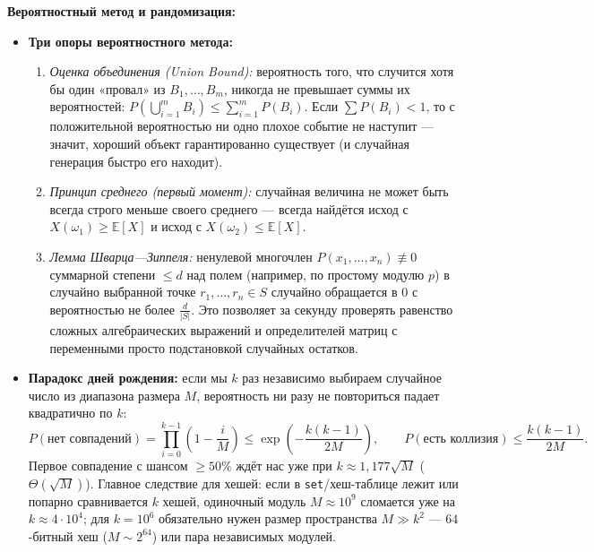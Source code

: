 \documentclass[10pt,a4paper]{article}
\renewcommand{\le}{\leqslant}
\renewcommand{\ge}{\geqslant}
\newcommand{\E}{\mathbb{E}}
\begin{document}
\textbf{Вероятностный метод и рандомизация:}
\begin{itemize}
  \item \textbf{Три опоры вероятностного метода:}
  \begin{enumerate}
    \item \emph{Оценка объединения (Union Bound):} вероятность того, что случится хотя бы один «провал» из $B_1, \dots, B_m$, никогда не превышает суммы их вероятностей: $P(\bigcup_{i=1}^m B_i) \le \sum_{i=1}^m P(B_i)$. Если $\sum P(B_i) < 1$, то с положительной вероятностью ни одно плохое событие не наступит — значит, хороший объект гарантированно существует (и случайная генерация быстро его находит).
    \item \emph{Принцип среднего (первый момент):} случайная величина не может быть всегда строго меньше своего среднего — всегда найдётся исход с $X(\omega_1) \ge \E[X]$ и исход с $X(\omega_2) \le \E[X]$.
    \item \emph{Лемма Шварца—Зиппеля:} ненулевой многочлен $P(x_1, \dots, x_n) \not\equiv 0$ суммарной степени $\le d$ над полем (например, по простому модулю $p$) в случайно выбранной точке $r_1, \dots, r_n \in S$ случайно обращается в $0$ с вероятностью не более $\frac{d}{|S|}$. Это позволяет за секунду проверять равенство сложных алгебраических выражений и определителей матриц с переменными просто подстановкой случайных остатков.
  \end{enumerate}

  \item \textbf{Парадокс дней рождения:} если мы $k$ раз независимо выбираем случайное число из диапазона размера $M$, вероятность ни разу не повториться падает квадратично по $k$:
  \[
    P(\text{нет совпадений}) = \prod_{i=0}^{k - 1}\left(1 - \frac{i}{M}\right) \le \exp\!\left(-\frac{k(k - 1)}{2M}\right), \qquad
    P(\text{есть коллизия}) \le \frac{k(k - 1)}{2M}.
  \]
  Первое совпадение с шансом $\ge 50\%$ ждёт нас уже при $k \approx 1{,}177\sqrt{M}$ ($\Theta(\sqrt{M})$). Главное следствие для хешей: если в \texttt{set}/хеш-таблице лежит или попарно сравнивается $k$ хешей, одиночный модуль $M \approx 10^9$ сломается уже на $k \approx 4 \cdot 10^4$; для $k = 10^6$ обязательно нужен размер пространства $M \gg k^2$ — $64$-битный хеш ($M \sim 2^{64}$) или пара независимых модулей.


\end{itemize}
\end{document}
